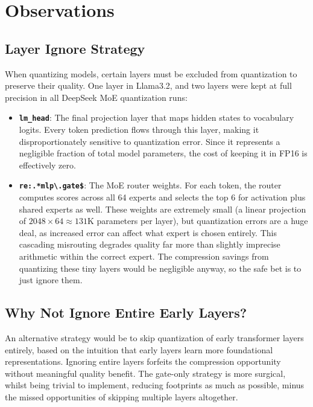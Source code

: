 \documentclass[10pt,twocolumn]{article}
\begin{document}
\section{Observations}

\subsection{Layer Ignore Strategy}

When quantizing models, certain layers must be excluded from quantization to preserve their quality. One layer in Llama3.2, and two layers were kept at full precision in all DeepSeek MoE quantization runs:

\begin{itemize}
  \item \textbf{\texttt{lm\_head}}: The final projection layer that maps hidden states to vocabulary logits. Every token prediction flows through this layer, making it disproportionately sensitive to quantization error. Since it represents a negligible fraction of total model parameters, the cost of keeping it in FP16 is effectively zero.

  \item \textbf{\texttt{re:.*mlp\textbackslash{}.gate\$}}: The MoE router weights. For each token, the router computes scores across all 64 experts and selects the top 6 for activation plus shared experts as well. These weights are extremely small (a linear projection of $2048 \times 64 \approx 131$K parameters per layer), but quantization errors are a huge deal, as increased error can affect what expert is chosen entirely. This cascading misrouting degrades quality far more than slightly imprecise arithmetic within the correct expert. The compression savings from quantizing these tiny layers would be negligible anyway, so the safe bet is to just ignore them.
\end{itemize}

\subsection{Why Not Ignore Entire Early Layers?}

An alternative strategy would be to skip quantization of early transformer layers entirely, based on the intuition that early layers learn more foundational representations. Ignoring entire layers forfeits the compression opportunity without meaningful quality benefit. The gate-only strategy is more surgical, whilst being trivial to implement, reducing footprints as much as possible, minus the missed opportunities of skipping multiple layers altogether.
\end{document}
